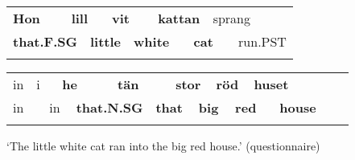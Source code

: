 \begin{tabular}{llllllllll}
\lsptoprule
{\bfseries Hon} & \multicolumn{2}{l}{{\bfseries lill}

} & \multicolumn{2}{l}{{\bfseries vit}

} & \multicolumn{2}{l}{{\bfseries kattan}

} & \multicolumn{2}{l}{sprang

} & \\
\multicolumn{2}{l}{{\bfseries that.F.SG}

} & \multicolumn{2}{l}{{\bfseries little}

} & \multicolumn{2}{l}{{\bfseries white}

} & \multicolumn{2}{l}{{\bfseries cat}

} & \multicolumn{2}{l}{run.PST

}\\
\lspbottomrule
\end{tabular}

\begin{tabular}{llllllllllllllll}
\lsptoprule
in & \multicolumn{2}{l}{i

} & \multicolumn{2}{l}{{\bfseries he}

} & \multicolumn{2}{l}{{\bfseries tän}

} & \multicolumn{2}{l}{{\bfseries stor}

} & \multicolumn{2}{l}{{\bfseries röd}

} & \multicolumn{2}{l}{{\bfseries huset}

} & \multicolumn{2}{l}{} & \\
\multicolumn{2}{l}{in

} & \multicolumn{2}{l}{in

} & \multicolumn{2}{l}{{\bfseries that.N.SG}

} & \multicolumn{2}{l}{{\bfseries that}

} & \multicolumn{2}{l}{{\bfseries big}

} & \multicolumn{2}{l}{{\bfseries red}

} & \multicolumn{2}{l}{{\bfseries house}

} & \multicolumn{2}{l}{}\\
\lspbottomrule
\end{tabular}

\begin{styleTranslation}
 ‘The little white cat ran into the big red house.’ (questionnaire)

\end{styleTranslation}

